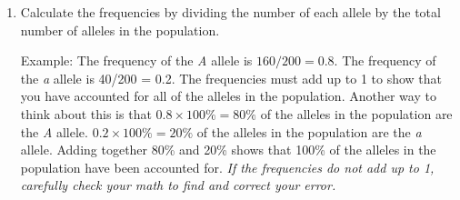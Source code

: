 \documentclass[12pt]{exam}
\newcommand{\allele}[1]{\textit{#1}}
\begin{document}
\begin{enumerate}
	\item Calculate the frequencies by dividing the number of each allele by the total number of alleles in the population.
	
	Example: The frequency of the \allele{A} allele is $160/200 = 0.8$. The frequency of the \allele{a} allele is 40/200 = 0.2.  The frequencies must add up to 1 to show that you have accounted for all of the alleles in the population. Another way to think about this is that $0.8 \times 100\% = 80\%$ of the alleles in the population are the \allele{A} allele. $0.2 \times 100\% = 20\%$ of the alleles in the population are the \allele{a} allele. Adding together 80\% and 20\% shows that 100\% of the alleles in the population have been accounted for. \emph{If the frequencies do not add up to 1, carefully check your math to find and correct your error.}
	
\end{enumerate}
\end{document}
